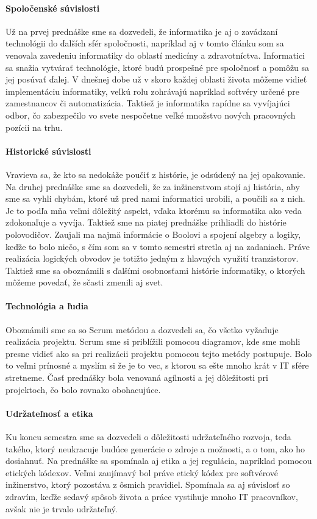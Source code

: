 \documentclass[10pt,twoside,slovak,a4paper]{article}
\begin{document}
 \paragraph{Spoločenské súvislosti}
Už na prvej prednáške sme sa dozvedeli, že informatika je aj o zavádzaní technológii do ďalších sfér spoločnosti, napríklad aj v tomto článku som sa venovala zavedeniu informatiky do oblastí medicíny a zdravotníctva. Informatici sa snažia vytvárať technológie, ktoré budú prospešné pre spoločnosť a pomôžu sa jej posúvať ďalej. V dnešnej dobe už v skoro každej oblasti života môžeme vidieť implementáciu informatiky, veľkú rolu zohrávajú napríklad softvéry určené pre zamestnancov či automatizácia. Taktiež je informatika rapídne sa vyvíjajúci odbor, čo zabezpečilo vo svete nespočetne veľké množstvo nových pracovných pozícii na trhu.

\paragraph{Historické súvislosti}
Vravieva sa, že kto sa nedokáže poučiť z histórie, je odsúdený na jej opakovanie. Na druhej prednáške sme sa dozvedeli, že za inžinerstvom stojí aj história, aby sme sa vyhli chybám, ktoré už pred nami informatici urobili, a poučili sa z nich. Je to podľa mňa veľmi dôležitý aspekt, vďaka ktorému sa informatika ako veda zdokonaľuje a vyvíja. Taktiež sme na piatej prednáške prihliadli do histórie polovodičov. Zaujali ma najmä informácie o Boolovi a spojení algebry a logiky, keďže to bolo niečo, s čím som sa v tomto semestri stretla aj na zadaniach. Práve realizácia logických obvodov je totižto jedným z hlavných využití tranzistorov. Taktiež sme sa oboznámili s ďalšími osobnosťami histórie informatiky, o ktorých môžeme povedať, že sčasti zmenili aj svet.

\paragraph{Technológia a ľudia}
Oboznámili sme sa so Scrum metódou a dozvedeli sa, čo všetko vyžaduje realizácia projektu. Scrum sme si priblížili pomocou diagramov, kde sme mohli presne vidieť ako sa pri realizácii projektu pomocou tejto metódy postupuje. Bolo to veľmi prínosné a myslím si že je to vec, s ktorou sa ešte mnoho krát v IT sfére stretneme. Časť prednášky bola venovaná agílnosti a jej dôležitosti pri projektoch, čo bolo rovnako obohacujúce.

\paragraph{Udržateľnosť a etika}
Ku koncu semestra sme sa dozvedeli o dôležitosti udržateľného rozvoja, teda takého, ktorý neukracuje budúce generácie o zdroje a možnosti, a o tom, ako ho dosiahnuť. Na prednáške sa spomínala aj etika a jej regulácia, napríklad pomocou etických kódexov. Veľmi zaujímavý bol práve etický kódex pre softvérové inžinerstvo, ktorý pozostáva z ôsmich pravidiel. Spomínala sa aj súvislosť so zdravím, keďže sedavý spôsob života a práce vystihuje mnoho IT pracovníkov, avšak nie je trvalo udržateľný.
\end{document}
